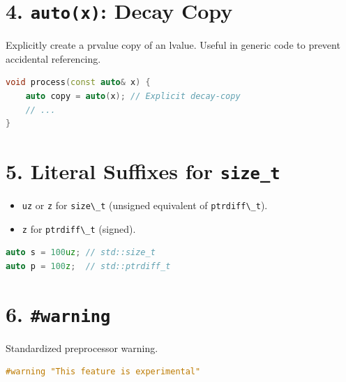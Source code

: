\hypertarget{autox-decay-copy}{%
\section{\texorpdfstring{4. \texttt{auto(x)}: Decay
Copy}{4. auto(x): Decay Copy}}\label{autox-decay-copy}}

Explicitly create a prvalue copy of an lvalue. Useful in generic code to
prevent accidental referencing.

\begin{lstlisting}[language={C++}]
void process(const auto& x) {
    auto copy = auto(x); // Explicit decay-copy
    // ...
}
\end{lstlisting}

\hypertarget{literal-suffixes-for-size_t}{%
\section{\texorpdfstring{5. Literal Suffixes for
\texttt{size\_t}}{5. Literal Suffixes for size\_t}}\label{literal-suffixes-for-size_t}}

\begin{itemize}
\tightlist
\item
  \passthrough{\lstinline!uz!} or \passthrough{\lstinline!z!} for
  \passthrough{\lstinline!size\_t!} (unsigned equivalent of
  \passthrough{\lstinline!ptrdiff\_t!}).
\item
  \passthrough{\lstinline!z!} for \passthrough{\lstinline!ptrdiff\_t!}
  (signed).
\end{itemize}

\begin{lstlisting}[language={C++}]
auto s = 100uz; // std::size_t
auto p = 100z;  // std::ptrdiff_t
\end{lstlisting}

\hypertarget{warning}{%
\section{\texorpdfstring{6.
\texttt{\#warning}}{6. \#warning}}\label{warning}}

Standardized preprocessor warning.

\begin{lstlisting}[language={C++}]
#warning "This feature is experimental"
\end{lstlisting}
